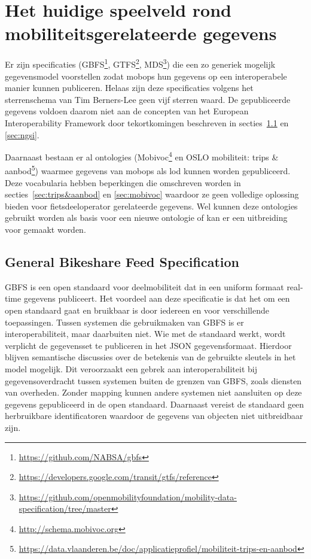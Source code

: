 \chapter{Het huidige speelveld rond mobiliteitsgerelateerde gegevens}

Er zijn specificaties (GBFS\footnote{\url{https://github.com/NABSA/gbfs}}, GTFS\footnote{\url{https://developers.google.com/transit/gtfs/reference}}, MDS\footnote{\url{https://github.com/openmobilityfoundation/mobility-data-specification/tree/master}}) die een zo generiek mogelijk gegevensmodel voorstellen zodat \glspl{mobop} hun gegevens op een interoperabele manier kunnen publiceren. Helaas zijn deze specificaties volgens het sterrenschema van Tim Berners-Lee geen vijf sterren waard. De gepubliceerde gegevens voldoen daarom niet aan de concepten van het European Interoperability Framework door tekortkomingen beschreven in secties~\ref{sec:GBFS} en \ref{sec:ngsi}.

Daarnaast bestaan er al \glspl{ontologie} (Mobivoc\footnote{\url{http://schema.mobivoc.org}} en OSLO mobiliteit: trips \& aanbod\footnote{\url{https://data.vlaanderen.be/doc/applicatieprofiel/mobiliteit-trips-en-aanbod}}) waarmee gegevens van \glspl{mobop} als \acrshort{lod} kunnen worden gepubliceerd. Deze vocabularia hebben beperkingen die omschreven worden in secties~\ref{sec:trips&aanbod} en \ref{sec:mobivoc} waardoor ze geen volledige oplossing bieden voor fietsdeeloperator gerelateerde gegevens. Wel kunnen deze \glspl{ontologie} gebruikt worden als basis voor een nieuwe ontologie of kan er een uitbreiding voor gemaakt worden. 

\section{General Bikeshare Feed Specification}
\label{sec:GBFS}
GBFS is een open standaard voor deelmobiliteit dat in een uniform formaat real-time gegevens publiceert. Het voordeel aan deze specificatie is dat het om een open standaard gaat en bruikbaar is door iedereen en voor verschillende toepassingen. Tussen systemen die gebruikmaken van GBFS is er interoperabiliteit, maar daarbuiten niet. Wie met de standaard werkt, wordt verplicht de gegevensset te publiceren in het JSON gegevensformaat. Hierdoor blijven semantische discussies over de betekenis van de gebruikte sleutels in het model mogelijk. Dit veroorzaakt een gebrek aan interoperabiliteit bij gegevensoverdracht tussen systemen buiten de grenzen van GBFS, zoals diensten van overheden. Zonder mapping kunnen andere systemen niet aansluiten op deze gegevens gepubliceerd in de open standaard. Daarnaast vereist de standaard geen herbruikbare identificatoren waardoor de gegevens van objecten niet uitbreidbaar zijn. 

